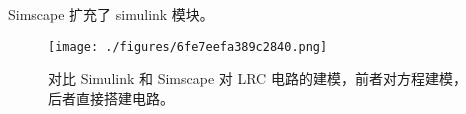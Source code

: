 
Simscape 扩充了 simulink 模块。
\begin{figure}[ht]
\centering
\texttt{[image: ./figures/6fe7eefa389c2840.png]}
\caption{对比 Simulink 和 Simscape 对 LRC 电路的建模，前者对方程建模，后者直接搭建电路。} \label{fig_simsca_1}
\end{figure}
